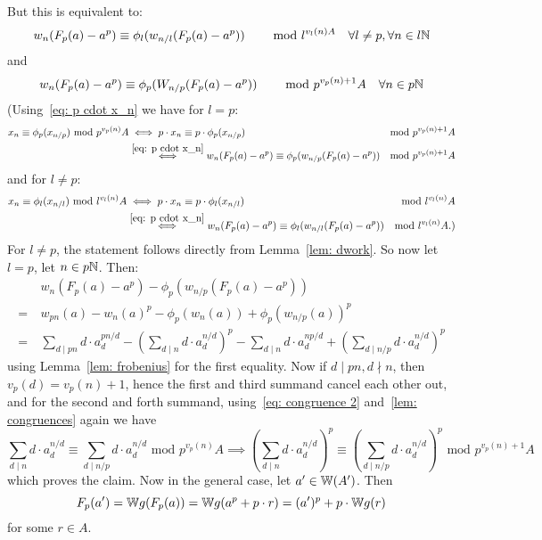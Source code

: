 \begin{beweis}
    But this is equivalent to:
    \[
        w_n(F_p(a)-a^p) \equiv \phi_l(w_{n/l}(F_p(a)-a^p))
         \text{\hskip8mm mod }l^{v_l(n)A} \quad \forall l \neq p, \forall n \in l\mathbb{N}
    \]
    and 
    \[
      w_n(F_p(a)-a^p) \equiv \phi_p(W_{n/p}(F_p(a)-a^p)) 
      \text{\hskip8mm mod } p^{v_p(n)+1}A \quad \forall n \in p\mathbb{N}
    \]
    (Using~\ref{eq: p cdot x_n} we have for $l=p$:
    \begin{align*}
        x_n \equiv \phi_p(x_{n/p}) \text{ mod }p^{v_p(n)}A
        &\iff p \cdot x_n \equiv p \cdot \phi_p(x_{n/p}) 
        &\text{mod }p^{v_p(n)+1}A \\
        &\overset{\ref{eq: p cdot x_n}}{\iff} w_n(F_p(a)-a^p) \equiv \phi_p(w_{n/p}(F_p(a)-a^p)) 
        &\text{mod }p^{v_p(n)+1}A
    \end{align*}
    and for $l \neq p$: 
    \begin{align*}
        x_n \equiv \phi_l(x_{n/l}) \text{ mod }l^{v_l(n)}A
        &\iff p \cdot x_n \equiv p \cdot \phi_l(x_{n/l}) 
        &\text{mod }l^{v_l(n)}A \\
        &\overset{\ref{eq: p cdot x_n}}{\iff} w_n(F_p(a)-a^p) \equiv \phi_l(w_{n/l}(F_p(a)-a^p)) 
        &\text{mod }l^{v_l(n)}A.)
    \end{align*}
    For $l \neq p$, the statement follows directly from Lemma~\ref{lem: dwork}.
    So now let $l = p$, let $n \in p\mathbb{N}$. Then:
    \begin{align*}
        &w_n(F_p(a)-a^p) - \phi_p(w_{n/p}(F_p(a)-a^p)) \\
        = \ &w_{pn}(a) - w_n(a)^p - \phi_p(w_n(a)) + \phi_p(w_{n/p}(a))^p \\
        = \ &\sum_{d \mid pn}d \cdot a_d^{pn/d} - ( \sum_{d \mid n}d \cdot a_d^{n/d} )^p 
        - \sum_{d \mid n}d \cdot a_d^{np/d} + ( \sum_{d \mid n/p}d \cdot a_d^{n/d} )^p
    \end{align*}
    using Lemma~\ref{lem: frobenius} for the first equality.
    Now if $d \mid pn, d \nmid n$, then $v_p(d) = v_p(n)+1$, hence the first and third summand 
    cancel each other out, and for the second and forth summand, using~\ref{eq: congruence 2} and~\ref{lem: congruences}
    again we have 
    \[
        \sum_{d \mid n}d \cdot a_d^{n/d} \equiv \sum_{d \mid n/p}d \cdot a_d^{n/d}
        \text{ mod }p^{v_p(n)}A
        \implies ( \sum_{d \mid n}d \cdot a_d^{n/d} )^p  \equiv 
        ( \sum_{d \mid n/p}d \cdot a_d^{n/d} )^p
        \text{ mod }p^{v_p(n)+1}A
    \]
    which proves the claim. Now in the general case, let $a' \in \mathbb{W}(A')$.
    Then \[
        F_p(a') = \mathbb{W} g (F_p(a)) = \mathbb{W} g(a^p + p \cdot r) = (a')^p + p \cdot \mathbb{W} g(r)
    \]
    for some $r \in A$.
\end{beweis}

